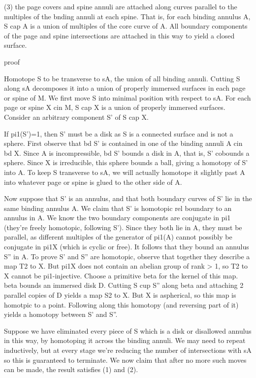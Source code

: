 (3) the page covers and spine annuli are attached along curves parallel to the
multiples of the bnding annuli at each spine. That is, for each binding annulus
A, S cap A is a union of multiples of the core curve of A. All boundary
components of the page and spine intersections are attached in this way to
yield a closed surface.

proof

Homotope S to be transverse to sA, the union of all binding annuli. Cutting
S along sA decomposes it into a union of properly immersed surfaces in each
page or spine of M. We first move S into minimal position with respect to sA.
For each page or spine X cin M, S cap X is a union of properly immersed
surfaces. Consider an arbitrary component S' of S cap X.

If pi1(S')=1, then S' must be a disk as S is a connected surface and is not
a sphere. First observe that bd S' is contained in one of the binding annuli
A cin bd X. Since A is incompressible, bd S' bounds a disk in A, that is, S'
cobounds a sphere. Since X is irreducible, this sphere bounds a ball, giving
a homotopy of S' into A. To keep S transverse to sA, we will actually homotope
it slightly past A into whatever page or spine is glued to the other side of A.

Now suppose that S' is an annulus, and that both boundary curves of S' lie in
the same binding annulus A. We claim that S' is homotopic rel boundary to an
annulus in A. We know the two boundary components are conjugate in pi1 (they're
freely homotopic, following S'). Since they both lie in A, they must be
parallel, as different multiples of the generator of pi1(A) cannot possibly be
conjugate in pi1X (which is cyclic or free). It follows that they bound an
annulus S'' in A.  To prove S' and S'' are homotopic, observe that together
they describe a map T2 to X. But pi1X does not contain an abelian group of rank
> 1, so T2 to X cannot be pi1-injective. Choose a primitive beta for the kernel
of this map.  beta bounds an immersed disk D. Cutting S cup S'' along beta and
attaching 2 parallel copies of D yields a map S2 to X. But X is aspherical, so
this map is homotpic to a point. Following along this homotopy (and reversing
part of it) yields a homotopy between S' and S''.

Suppose we have eliminated every piece of S which is a disk or disallowed
annulus in this way, by homotoping it across the binding annuli. We may need to
repeat inductively, but at every stage we're reducing the number of
intersections with sA so this is guaranteed to terminate. We now claim that
after no more such moves can be made, the result satisfies (1) and (2).

